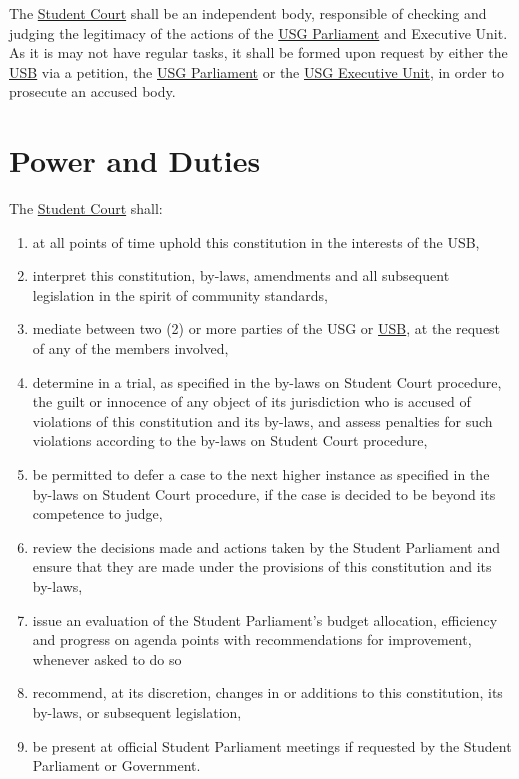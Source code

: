 \label{StudentCourtDef}
The \hyperref[StudentCourtDef]{Student Court} shall be an independent body, responsible of checking and judging the legitimacy of the actions of the \hyperref[USGParliamentDef]{USG Parliament} and Executive Unit. As it is may not have regular tasks, it shall be formed upon request by either the \hyperref[studentbody]{USB} via a petition, the \hyperref[USGParliamentDef]{USG Parliament} or the \hyperref[USGexecutiveUnitDef]{USG Executive Unit}, in order to prosecute an accused body.


\section{Power and Duties}
The \hyperref[StudentCourtDef]{Student Court} shall:
\begin{enumerate}
\item at all points of time uphold this constitution in the interests of the USB,
\item interpret this constitution, by-laws, amendments and all subsequent legislation in the spirit
of community standards,
\item mediate between two (2) or more parties of the USG or \hyperref[studentbody]{USB}, at the request of any of
the members involved,
\item determine in a trial, as specified in the by-laws on Student Court procedure, the guilt or
innocence of any object of its jurisdiction who is accused of violations of this constitution
and its by-laws, and assess penalties for such violations according to the by-laws on
Student Court procedure,
\item  be permitted to defer a case to the next higher instance as specified in the by-laws on
Student Court procedure, if the case is decided to be beyond its competence to judge,
\item review the decisions made and actions taken by the Student Parliament and ensure that
they are made under the provisions of this constitution and its by-laws,
\item issue an evaluation of the Student Parliament's budget allocation, efficiency and
progress on agenda points with recommendations for improvement, whenever asked to do so
\item recommend, at its discretion, changes in or additions to this constitution, its by-laws, or
subsequent legislation,
\item be present at official Student Parliament meetings if requested by the Student Parliament
or Government. 
\end{enumerate}

